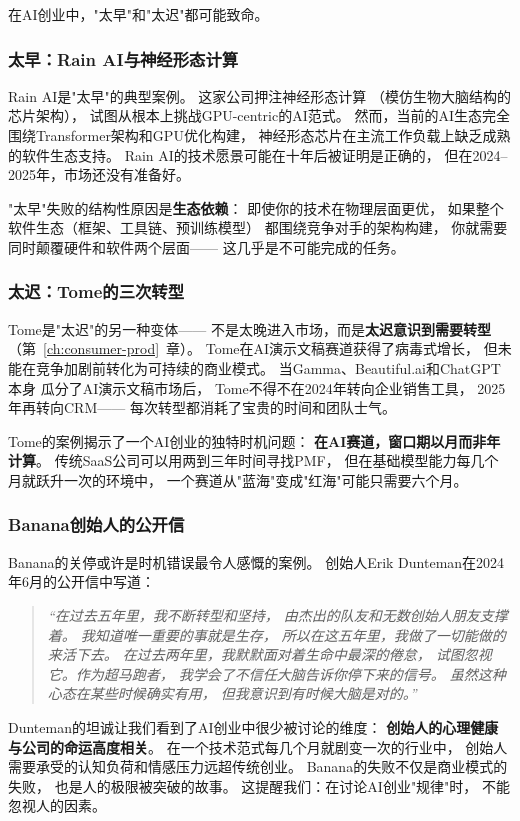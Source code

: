在AI创业中，"太早"和"太迟"都可能致命。

\subsubsection{太早：Rain AI与神经形态计算}
Rain AI是"太早"的典型案例。
这家公司押注神经形态计算
（模仿生物大脑结构的芯片架构），
试图从根本上挑战GPU-centric的AI范式。
然而，当前的AI生态完全围绕Transformer架构和GPU优化构建，
神经形态芯片在主流工作负载上缺乏成熟的软件生态支持。
Rain AI的技术愿景可能在十年后被证明是正确的，
但在2024--2025年，市场还没有准备好。

"太早"失败的结构性原因是\textbf{生态依赖}：
即使你的技术在物理层面更优，
如果整个软件生态（框架、工具链、预训练模型）
都围绕竞争对手的架构构建，
你就需要同时颠覆硬件和软件两个层面——
这几乎是不可能完成的任务。

\subsubsection{太迟：Tome的三次转型}
Tome是"太迟"的另一种变体——
不是太晚进入市场，而是\textbf{太迟意识到需要转型}
（第~\ref{ch:consumer-prod}~章）。
Tome在AI演示文稿赛道获得了病毒式增长，
但未能在竞争加剧前转化为可持续的商业模式。
当Gamma、Beautiful.ai和ChatGPT本身
瓜分了AI演示文稿市场后，
Tome不得不在2024年转向企业销售工具，
2025年再转向CRM——
每次转型都消耗了宝贵的时间和团队士气。

Tome的案例揭示了一个AI创业的独特时机问题：
\textbf{在AI赛道，窗口期以月而非年计算}。
传统SaaS公司可以用两到三年时间寻找PMF，
但在基础模型能力每几个月就跃升一次的环境中，
一个赛道从"蓝海"变成"红海"可能只需要六个月。

\subsubsection{Banana创始人的公开信}
Banana的关停或许是时机错误最令人感慨的案例。
创始人Erik Dunteman在2024年6月的公开信中写道：

\begin{quote}
\itshape
``在过去五年里，我不断转型和坚持，
由杰出的队友和无数创始人朋友支撑着。
我知道唯一重要的事就是生存，
所以在这五年里，我做了一切能做的来活下去。
在过去两年里，我默默面对着生命中最深的倦怠，
试图忽视它。作为超马跑者，
我学会了不信任大脑告诉你停下来的信号。
虽然这种心态在某些时候确实有用，
但我意识到有时候大脑是对的。''
\end{quote}

Dunteman的坦诚让我们看到了AI创业中很少被讨论的维度：
\textbf{创始人的心理健康与公司的命运高度相关}。
在一个技术范式每几个月就剧变一次的行业中，
创始人需要承受的认知负荷和情感压力远超传统创业。
Banana的失败不仅是商业模式的失败，
也是人的极限被突破的故事。
这提醒我们：在讨论AI创业"规律"时，
不能忽视人的因素。

